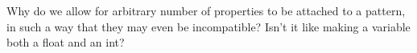 


Why do we allow for arbitrary number of properties to be attached to a
pattern, in such a way that they may even be incompatible? Isn't it
like making a variable both a float and an int?

